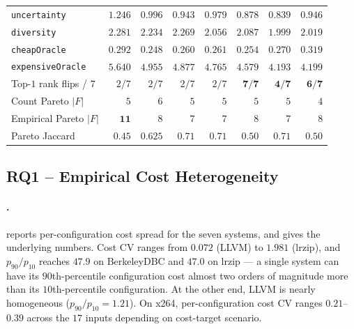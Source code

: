\begin{table}[t]
\begin{tabular}{l r r r r r r r}
\texttt{uncertainty}          & $1.246$     & $0.996$     & $0.943$     & $0.979$     & $0.878$     & $0.839$     & $0.946$     \\
\texttt{diversity}            & $\mathbf{2.281}$ & $\mathbf{2.234}$ & $\mathbf{2.269}$ & $\mathbf{2.056}$ & $\mathbf{2.087}$ & $\mathbf{1.999}$ & $\mathbf{2.019}$ \\
\texttt{cheapOracle}          & $0.292$     & $0.248$     & $0.260$     & $0.261$     & $0.254$     & $0.270$     & $0.319$     \\
\texttt{expensiveOracle}      & $5.640$     & $4.955$     & $4.877$     & $4.765$     & $4.579$     & $4.193$     & $4.199$     \\
\midrule
Top-$1$ rank flips / $7$      & $2/7$       & $2/7$       & $2/7$       & $2/7$       & $\mathbf{7/7}$ & $\mathbf{4/7}$ & $\mathbf{6/7}$ \\
Count Pareto $|F|$            & $5$         & $6$         & $5$         & $5$         & $5$         & $5$         & $4$         \\
Empirical Pareto $|F|$        & $\mathbf{11}$ & $8$       & $7$         & $7$         & $8$         & $7$         & $8$         \\
Pareto Jaccard                & $0.45$      & $0.625$    & $\mathbf{0.71}$ & $\mathbf{0.71}$ & $0.50$  & $\mathbf{0.71}$ & $0.50$      \\
\bottomrule
\end{tabular}
\end{table}

\subsection{RQ1 -- Empirical Cost Heterogeneity}
\label{subsec:results-rq1}

\paragraph*{\StudyReplication.}
 reports per-configuration cost spread for
the seven \StudyReplication systems, and  gives the
underlying numbers. Cost CV ranges from $0.072$ (LLVM) to $1.981$
(lrzip), and $p_{90}/p_{10}$ reaches $47.9$ on BerkeleyDBC and $47.0$
on lrzip --- a single system can have its $90$th-percentile
configuration cost almost two orders of magnitude more than its
$10$th-percentile configuration. At the other end, LLVM is nearly
homogeneous ($p_{90}/p_{10}\!=\!1.21$). On x264, per-configuration cost
CV ranges $0.21$--$0.39$ across the $17$ inputs depending on
cost-target scenario.

